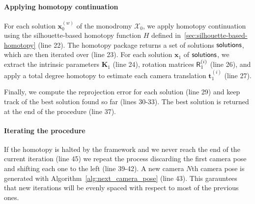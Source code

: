 \paragraph{Applying homotopy continuation}
For each solution $\mathbf{x}_0^{(w)}$ of the monodromy $\mathcal{X}_0$, we apply homotopy continuation using the silhouette-based homotopy function $H$ defined in~\eqref{sec:silhouette-based-homotopy} (line 22). The homotopy package returns a set of solutions $\mathsf{solutions}$, which are then iterated over (line 23).
For each solution $\mathbf{x}_1$ of $\mathsf{solutions}$, we extract the intrinsic parameters $\mathbf{K}_1$ (line 24), rotation matrices $\mathsf{R}_1^{(i)}$ (line 26), and apply a total degree homotopy to estimate each camera translation $\mathbf{t}_1^{(i)}$ (line 27).

Finally, we compute the reprojection error for each solution (line 29) and keep track of the best solution found so far (lines 30-33). The best solution is returned at the end of the procedure (line 37).

\paragraph{Iterating the procedure}
If the homotopy is halted by the framework and we never reach the end of the current iteration (line 45) we repeat the process discarding the first camera pose and shifting each one to the left (line 39-42). A new camera $N$th camera pose is generated with Algorithm~\ref{alg:next_camera_pose} (line 43). This garauntees that new iterations will be evenly spaced with respect to most of the previous ones.

